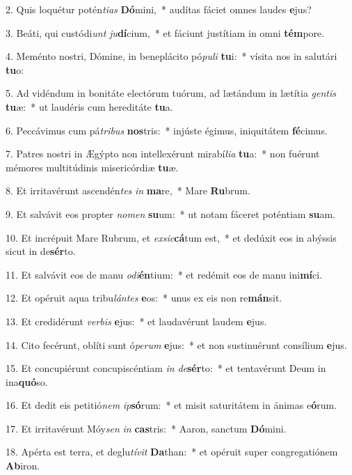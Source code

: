 2. Quis loquétur potén\textit{ti}\textit{as} \textbf{Dó}mini,~*  audítas fáciet omnes laudes \textbf{e}jus?\

3. Beáti, qui custódi\textit{unt} \textit{ju}\textbf{dí}cium,~*  et fáciunt justítiam in omni \textbf{tém}pore.\

4. Meménto nostri, Dómine, in beneplácito pó\textit{pu}\textit{li} \textbf{tu}i:~*  vísita nos in salutári \textbf{tu}o:\

5. Ad vidéndum in bonitáte electórum tuórum, ad lætándum in lætítia \textit{gen}\textit{tis} \textbf{tu}æ:~*  ut laudéris cum hereditáte \textbf{tu}a.\

6. Peccávimus cum pá\textit{tri}\textit{bus} \textbf{nos}tris:~*  injúste égimus, iniquitátem \textbf{fé}cimus.\

7. Patres nostri in Ægýpto non intellexérunt mirabí\textit{li}\textit{a} \textbf{tu}a:~*  non fuérunt mémores multitúdinis misericórdiæ \textbf{tu}æ.\

8. Et irritavérunt ascendén\textit{tes} \textit{in} \textbf{ma}re,~*  Mare \textbf{Ru}brum.\

9. Et salvávit eos propter \textit{no}\textit{men} \textbf{su}um:~*  ut notam fáceret poténtiam \textbf{su}am.\

10. Et incrépuit Mare Rubrum, et \textit{ex}\textit{sic}\textbf{cá}tum est,~*  et dedúxit eos in abýssis sicut in de\textbf{sér}to.\

11. Et salvávit eos de manu \textit{o}\textit{di}\textbf{én}tium:~*  et redémit eos de manu ini\textbf{mí}ci.\

12. Et opéruit aqua tribu\textit{lán}\textit{tes} \textbf{e}os:~*  unus ex eis non re\textbf{mán}sit.\

13. Et credidérunt \textit{ver}\textit{bis} \textbf{e}jus:~*  et laudavérunt laudem \textbf{e}jus.\

14. Cito fecérunt, oblíti sunt ó\textit{pe}\textit{rum} \textbf{e}jus:~*  et non sustinuérunt consílium \textbf{e}jus.\

15. Et concupiérunt concupiscéntiam \textit{in} \textit{de}\textbf{sér}to:~*  et tentavérunt Deum in ina\textbf{quó}so.\

16. Et dedit eis petitió\textit{nem} \textit{ip}\textbf{só}rum:~*  et misit saturitátem in ánimas e\textbf{ó}rum.\

17. Et irritavérunt Móy\textit{sen} \textit{in} \textbf{cas}tris:~*  Aaron, sanctum \textbf{Dó}mini.\

18. Apérta est terra, et deglu\textit{tí}\textit{vit} \textbf{Da}than:~*  et opéruit super congregatiónem \textbf{Ab}iron.\

